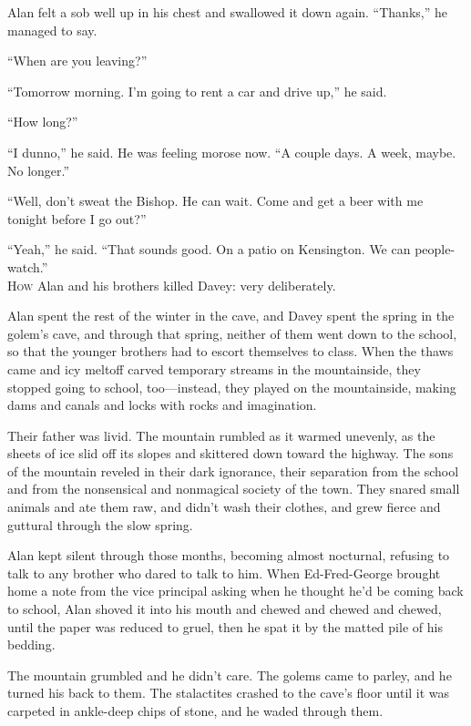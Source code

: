 \documentclass{article}
\begin{document}
Alan felt a sob well up in his chest and swallowed it down again. 
``Thanks,'' he managed to say.

``When are you leaving?''

``Tomorrow morning.  I'm going to rent a car and drive up,'' he said.

``How long?''

``I dunno,'' he said.  He was feeling morose now.  ``A couple days.  A
week, maybe.  No longer.''

``Well, don't sweat the Bishop.  He can wait.  Come and get a beer
with me tonight before I go out?''

``Yeah,'' he said.  ``That sounds good.  On a patio on Kensington.  We
can people-watch.''
\\
\lettrine[lines=3, lhang=.5, nindent=0pt, findent=2pt]{H}{ow} Alan and his brothers killed Davey:  very deliberately.

Alan spent the rest of the winter in the cave, and Davey spent the
spring in the golem's cave, and through that spring, neither of them
went down to the school, so that the younger brothers had to escort
themselves to class.  When the thaws came and icy meltoff carved
temporary streams in the mountainside, they stopped going to school,
too---instead, they played on the mountainside, making dams and canals
and locks with rocks and imagination.

Their father was livid.  The mountain rumbled as it warmed unevenly,
as the sheets of ice slid off its slopes and skittered down toward the
highway.  The sons of the mountain reveled in their dark ignorance,
their separation from the school and from the nonsensical and
nonmagical society of the town.  They snared small animals and ate
them raw, and didn't wash their clothes, and grew fierce and guttural
through the slow spring.

Alan kept silent through those months, becoming almost nocturnal,
refusing to talk to any brother who dared to talk to him.  When
Ed-Fred-George brought home a note from the vice principal asking when
he thought he'd be coming back to school, Alan shoved it into his
mouth and chewed and chewed and chewed, until the paper was reduced to
gruel, then he spat it by the matted pile of his bedding.

The mountain grumbled and he didn't care.  The golems came to parley,
and he turned his back to them.  The stalactites crashed to the cave's
floor until it was carpeted in ankle-deep chips of stone, and he waded
through them.
\end{document}
